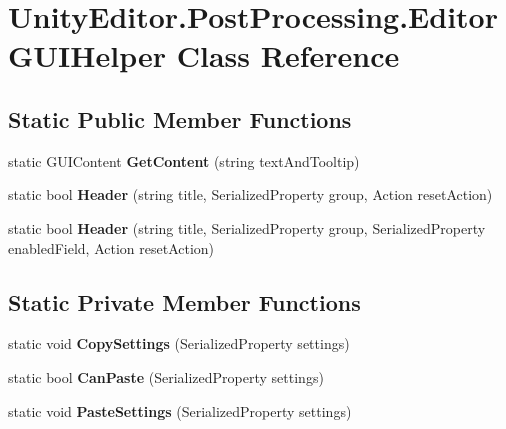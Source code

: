 \hypertarget{class_unity_editor_1_1_post_processing_1_1_editor_g_u_i_helper}{}\section{Unity\+Editor.\+Post\+Processing.\+Editor\+G\+U\+I\+Helper Class Reference}
\label{class_unity_editor_1_1_post_processing_1_1_editor_g_u_i_helper}
\subsection*{Static Public Member Functions}
\begin{DoxyCompactItemize}
\item 
\mbox{\label{class_unity_editor_1_1_post_processing_1_1_editor_g_u_i_helper_a15328ec30b8a62245b7afcecadebb77e}} 
static G\+U\+I\+Content {\bfseries Get\+Content} (string text\+And\+Tooltip)
\item 
\mbox{\label{class_unity_editor_1_1_post_processing_1_1_editor_g_u_i_helper_ad3b4bb7526a79a1fe31e79a866aa94f1}} 
static bool {\bfseries Header} (string title, Serialized\+Property group, Action reset\+Action)
\item 
\mbox{\label{class_unity_editor_1_1_post_processing_1_1_editor_g_u_i_helper_af1ac8fd49612ec41eeed8e935351de3c}} 
static bool {\bfseries Header} (string title, Serialized\+Property group, Serialized\+Property enabled\+Field, Action reset\+Action)
\end{DoxyCompactItemize}
\subsection*{Static Private Member Functions}
\begin{DoxyCompactItemize}
\item 
\mbox{\label{class_unity_editor_1_1_post_processing_1_1_editor_g_u_i_helper_a59a41f9fe5cc421253b73994e022f47d}} 
static void {\bfseries Copy\+Settings} (Serialized\+Property settings)
\item 
\mbox{\label{class_unity_editor_1_1_post_processing_1_1_editor_g_u_i_helper_aa94e5961fa1bba6e0b6e486c38344d86}} 
static bool {\bfseries Can\+Paste} (Serialized\+Property settings)
\item 
\mbox{\label{class_unity_editor_1_1_post_processing_1_1_editor_g_u_i_helper_a1690b5662412f9d0f60344c50965a58d}} 
static void {\bfseries Paste\+Settings} (Serialized\+Property settings)
\end{DoxyCompactItemize}
